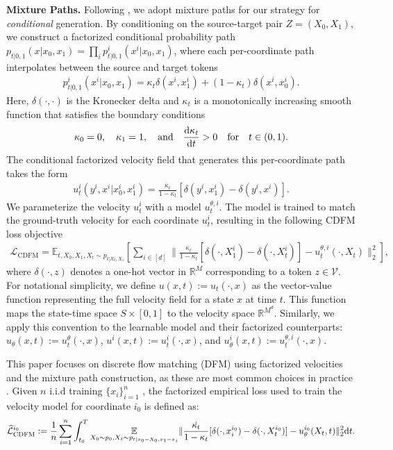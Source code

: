 \documentclass[12pt]{article}
\numberwithin{equation}{section}
\let\hat\widehat
\newcommand{\wh}{\widehat}
\renewcommand{\hat}{\wh}
\DeclareMathOperator*{\E}{{\mathbb{E}}}
\def\E{\mathbb{E}}
\let\cite\citep
\theoremstyle{theoremstyle}
\numberwithin{equation}{section}
\numberwithin{theorem}{section}
\numberwithin{proposition}{section}
\numberwithin{definition}{section}
\numberwithin{lemma}{section}
\numberwithin{assumption}{section}
\numberwithin{remark}{section}
\begin{document}
\textbf{Mixture Paths.}
Following \cite{gat2024discrete,lipman2024flow}, we adopt mixture paths for our strategy for \textit{conditional} generation. 
By conditioning on the source-target pair $Z = (X_0, X_1)$, we construct a factorized conditional probability path $p_{t|0,1}(x|x_0,x_1) = \prod_i p^i_{t|0,1}(x^i|x_0,x_1)$, where each per-coordinate path interpolates between the source and target tokens
\begin{align*}
    p^i_{t|0,1}(x^i|x_0,x_1)
    = \kappa_t \delta(x^i,x_1^i) + (1-\kappa_t) \delta(x^i,x_0^i).
\end{align*}
Here, $\delta(\cdot,\cdot)$ is the Kronecker delta and $\kappa_t$ is a monotonically increasing smooth function that satisfies the boundary conditions
\begin{align*}
    \kappa_0 = 0, \quad
    \kappa_1 = 1, \quad
    \text{and} \quad
    \dv{\kappa_t}{t} > 0 \quad
    \text{for} \quad t \in (0,1).
\end{align*}
The conditional factorized velocity field that generates this per-coordinate path takes the form
\begin{align}
\label{eq:mixture_path}
    u_t^i(y^i,x^i|x_0^i, x_1^i) 
    = \frac{\dot{\kappa_t}}{1-\kappa_t} 
    [\delta(y^i,x_1^i) - \delta(y^i,x^i)].
\end{align}
We parameterize the velocity $u^i_t$ with a model $u_t^{\theta,i}$.
The model is trained to match the ground-truth velocity for each coordinate $u^i_t$, resulting in the following CDFM loss objective
\begin{align}
\label{eqn:cdfm_mixture_p}
    \mathcal{L}_{\text{CDFM}}
    = \mathbb{E}_{t, X_0, X_1, X_t \sim p_{t|X_0,X_1}} \left[\sum_{i \in [d]} \| 
    \frac{\dot{\kappa_t}}{1-\kappa_t} 
    [\delta(\cdot,X_1^i) - \delta(\cdot,X_t^i)]  - u_t^{\theta,i}(\cdot,X_t) \|_2^2 \right],
\end{align}
where $\delta(\cdot, z)$ denotes a one-hot vector in $\mathbb{R}^M$ corresponding to a token $z \in \mathcal{V}$. 
For notational simplicity, we define $u(x,t) := u_t(\cdot, x)$ as the vector-value function representing the full velocity field for a state $x$ at time $t$. 
This function maps the state-time space $S \times [0,1]$ to the velocity space $\mathbb{R}^{M^d}$. 
Similarly, we apply this convention to the learnable model and their factorized counterparts: $u_\theta(x,t) := u_t^\theta(\cdot, x)$, $u^i(x,t) := u_t^i(\cdot, x)$, and $u^{i}_\theta(x,t) := u_t^{\theta,i}(\cdot, x)$.

This paper focuses on discrete flow matching (DFM) using factorized velocities and the mixture path construction, as these are most common choices in practice \cite{campbell2024generative,gat2024discrete,lipman2024flow}.
Given $n$ i.i.d training $\{x_i\}_{i=1}^n$ , the factorized empirical loss used to train the velocity model for coordinate $i_0$ is defined as:
\begin{align}
\label{eqn:cdfm_loss_empirical}
    \hat{\mathcal{L}}^{i_0}_{\rm CDFM}
    :=  \frac{1}{n} \sum_{i=1}^n \int_{t_0}^T \underset{X_0 \sim p_0,X_t \sim p_{t|x_0=X_0,x_1=x_i}} {\E} \|\frac{\dot{\kappa_t}}{1-\kappa_t} 
    [\delta(\cdot,x_i^{i_0}) - \delta(\cdot,X_t^{i_0})] -u^{i_0}_\theta(X_t,t)\|_2^2 \dd t.
\end{align}
\end{document}

